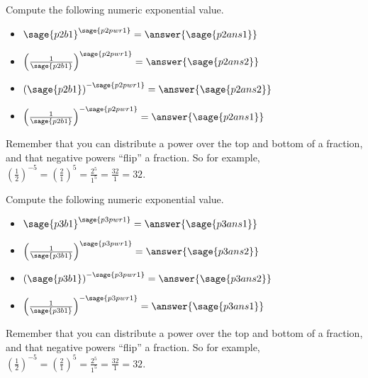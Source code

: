 \documentclass{ximera}
\begin{document}
\begin{problem}
    Compute the following numeric exponential value.
    
    \begin{itemize}
        \item $\sage{p2b1}^{\sage{p2pwr1}} = \answer{\sage{p2ans1}}$
        
        \item $\left(\frac{1}{\sage{p2b1}}\right)^{\sage{p2pwr1}} = \answer{\sage{p2ans2}}$
        
        \item $\left(\sage{p2b1}\right)^{-\sage{p2pwr1}} = \answer{\sage{p2ans2}}$
        
        \item $\left(\frac{1}{\sage{p2b1}}\right)^{-\sage{p2pwr1}} = \answer{\sage{p2ans1}}$
    
    \end{itemize}

    \begin{feedback}
        Remember that you can distribute a power over the top and bottom of a fraction, and that negative powers ``flip'' a fraction. So for example, $\left(\frac{1}{2}\right)^{-5} = \left(\frac{2}{1}\right)^{5} = \frac{2^5}{1^5} = \frac{32}{1} = 32.$
    \end{feedback}
\end{problem}


\begin{problem}
    Compute the following numeric exponential value.
    
    \begin{itemize}
        \item $\sage{p3b1}^{\sage{p3pwr1}} = \answer{\sage{p3ans1}}$
        
        \item $\left(\frac{1}{\sage{p3b1}}\right)^{\sage{p3pwr1}} = \answer{\sage{p3ans2}}$
        
        \item $\left(\sage{p3b1}\right)^{-\sage{p3pwr1}} = \answer{\sage{p3ans2}}$
        
        \item $\left(\frac{1}{\sage{p3b1}}\right)^{-\sage{p3pwr1}} = \answer{\sage{p3ans1}}$
    
    \end{itemize}
    \begin{feedback}
        Remember that you can distribute a power over the top and bottom of a fraction, and that negative powers ``flip'' a fraction. So for example, $\left(\frac{1}{2}\right)^{-5} = \left(\frac{2}{1}\right)^{5} = \frac{2^5}{1^5} = \frac{32}{1} = 32.$
    \end{feedback}
\end{problem}
\end{document}
